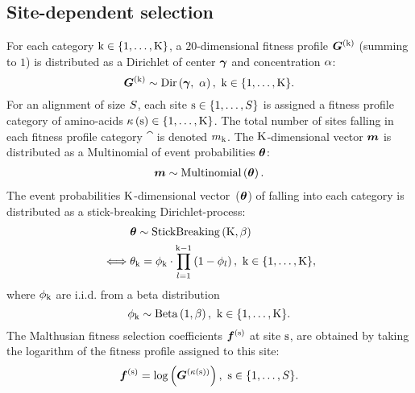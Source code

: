 \subsection{Site-dependent selection}
\label{sec:profiles}
For each category $\text{k} \in \{1, \hdots, \text{K}\}$, a $20$-dimensional fitness profile $\bm{G}^{(\text{k})}$ (summing to $1$) is distributed as a Dirichlet of center $\bm{\gamma}$ and concentration $\alpha$:
\begin{equation}
\label{eq:DistribBase}
\Base\catexp \sim \mathrm{Dir}\left( \Basecenter,\ \baseconc \right),\ \Setcat.
\end{equation}
For an alignment of size $S$, each site $\text{s} \in \{1, \hdots, S\}$ is assigned a fitness profile category of amino-acids $\kappa\left(\text{s}\right) \in \{1, \hdots, \text{K}\} $.
The total number of sites falling in each fitness profile category $\cat$ is denoted $m_{\text{k}}$.
The $\text{K}$-dimensional vector $\bm{m}$ is distributed as a Multinomial of event probabilities $\bm{\theta}$:
\begin{align}
\label{eq:DistribMultinomial}
\catMultiVar \sim \mathrm{Multinomial}\left( \StickBreaking \right).
\end{align}
The event probabilities $\text{K}$-dimensional vector~($\bm{\theta}$) of falling into each category is distributed as a stick-breaking \gls{Dirichlet-process}:
\begin{align}
\label{eq:DistribStickBreaking}
\begin{split}
& \StickBreaking \sim \mathrm{StickBreaking}\left( \Ncat, \stickbreakinghyper \right)\\
\iff & \stickbreaking_{\cat} = \stick_{\cat}\cdot \prod _{{\indice=1}}^{{\cat-1}}\left(1-\stick_{\indice}\right),\ \Setcat,
\end{split}
\end{align}
where $\phi_{\text{k}}$ are i.i.d.
from a beta distribution
\begin{equation}
\label{eq:Beta}
\stick_{\cat} \sim \mathrm{Beta}\left( 1, \stickbreakinghyper \right),\ \Setcat.
\end{equation}
The Malthusian fitness selection coefficients $\bm{f}^{(\text{s})}$ at site $\text{s}$, are obtained by taking the logarithm of the fitness profile assigned to this site:
\begin{equation}
\label{eq:sitefitness}
\Fit\siteexp = \log \left( \Base^{\left( \catsite \right)} \right),\ \Setsite.
\end{equation}

